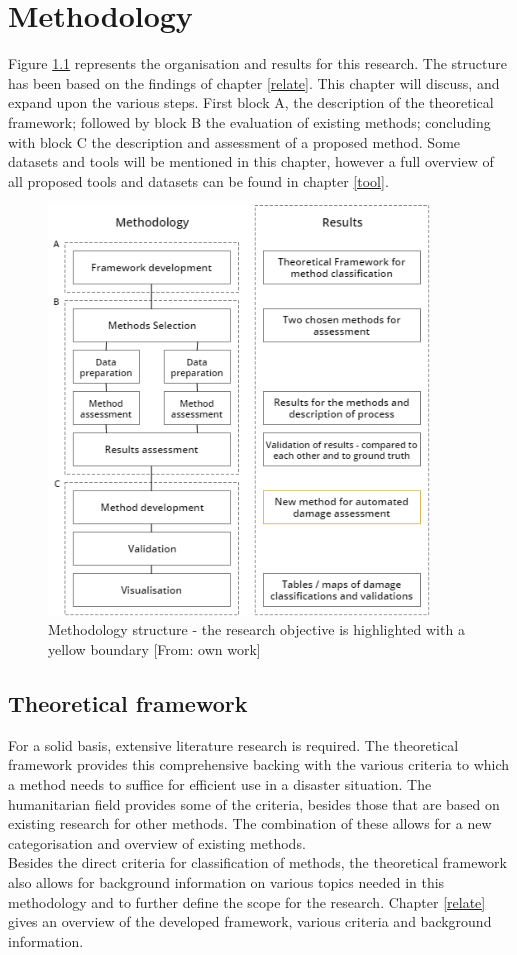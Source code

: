 \chapter{Methodology} \label{methodology}
Figure \ref{fig:method} represents the organisation and results for this research. The structure has been based on the findings of chapter \ref{relate}. This chapter will discuss, and expand upon the various steps. First block A, the description of the theoretical framework; followed by block B the evaluation of existing methods; concluding with block C the description and assessment of a proposed method. Some datasets and tools will be mentioned in this chapter, however a full overview of all proposed tools and datasets can be found in chapter \ref{tool}.

\begin{figure}[h]
	\centering
	\includegraphics[width=0.9\textwidth]{figs/methodology.png}
	\caption{Methodology structure - the research objective is highlighted with a yellow boundary [From: own work]}
	\label{fig:method}
\end{figure}
\clearpage
\section{Theoretical framework}
For a solid basis, extensive literature research is required. The theoretical framework provides this comprehensive backing with the various criteria to which a method needs to suffice for efficient use in a disaster situation. The humanitarian field provides some of the criteria, besides those that are based on existing research for other methods. The combination of these allows for a new categorisation and overview of existing methods. \\
Besides the direct criteria for classification of methods, the theoretical framework also allows for background information on various topics needed in this methodology and to further define the scope for the research. 
Chapter \ref{relate} gives an overview of the developed framework, various criteria and background information.

